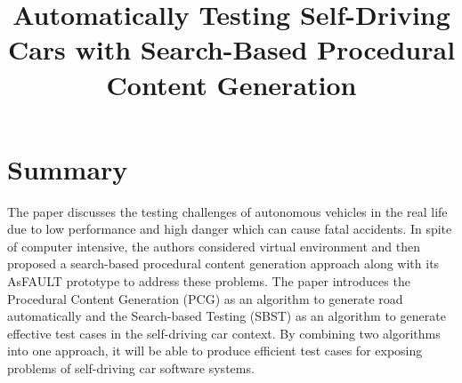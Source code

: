 \documentclass[10pt,a4paper]{report}
\title{Automatically Testing Self-Driving Cars with Search-Based Procedural Content Generation}
\begin{document}
\begin{center}
\textbf{\thetitle}
\end{center}


\section{Summary}
The paper discusses the testing challenges of autonomous vehicles in the real life due to low performance and high danger which can cause fatal accidents. 
%
In spite of computer intensive, the authors considered virtual environment and then proposed a search-based procedural content generation approach along with its AsFAULT prototype to address these problems. 
%
The paper introduces the Procedural Content Generation (PCG) as an algorithm to generate road automatically and the Search-based Testing (SBST) as an algorithm to generate effective test cases in the self-driving car context.
% 
By combining two algorithms into one approach, it will be able to produce efficient test cases for exposing problems of self-driving car software systems.
\end{document}
